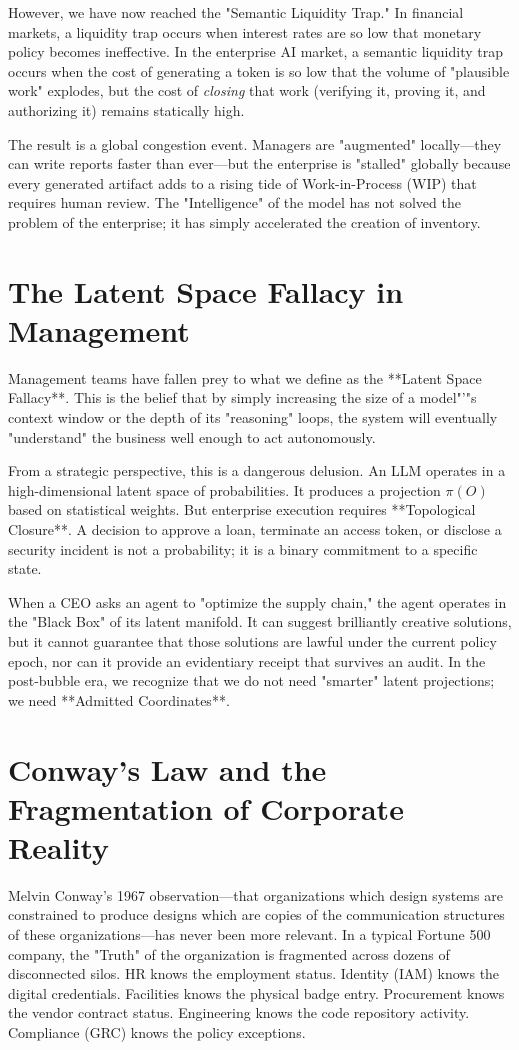 \documentclass[12pt,a4paper,oneside]{book}
\begin{document}
However, we have now reached the "Semantic Liquidity Trap." In financial markets, a liquidity trap occurs when interest rates are so low that monetary policy becomes ineffective. In the enterprise AI market, a semantic liquidity trap occurs when the cost of generating a token is so low that the volume of "plausible work" explodes, but the cost of \textit{closing} that work (verifying it, proving it, and authorizing it) remains statically high. 

The result is a global congestion event. Managers are "augmented" locally---they can write reports faster than ever---but the enterprise is "stalled" globally because every generated artifact adds to a rising tide of Work-in-Process (WIP) that requires human review. The "Intelligence" of the model has not solved the problem of the enterprise; it has simply accelerated the creation of inventory.

\section{The Latent Space Fallacy in Management}
Management teams have fallen prey to what we define as the **Latent Space Fallacy**. This is the belief that by simply increasing the size of a model"'"s context window or the depth of its "reasoning" loops, the system will eventually "understand" the business well enough to act autonomously. 

From a strategic perspective, this is a dangerous delusion. An LLM operates in a high-dimensional latent space of probabilities. It produces a projection $\pi(O)$ based on statistical weights. But enterprise execution requires **Topological Closure**. A decision to approve a loan, terminate an access token, or disclose a security incident is not a probability; it is a binary commitment to a specific state. 

When a CEO asks an agent to "optimize the supply chain," the agent operates in the "Black Box" of its latent manifold. It can suggest brilliantly creative solutions, but it cannot guarantee that those solutions are lawful under the current policy epoch, nor can it provide an evidentiary receipt that survives an audit. In the post-bubble era, we recognize that we do not need "smarter" latent projections; we need **Admitted Coordinates**.

\section{Conway’s Law and the Fragmentation of Corporate Reality}
Melvin Conway’s 1967 observation---that organizations which design systems are constrained to produce designs which are copies of the communication structures of these organizations---has never been more relevant. In a typical Fortune 500 company, the "Truth" of the organization is fragmented across dozens of disconnected silos. HR knows the employment status. Identity (IAM) knows the digital credentials. Facilities knows the physical badge entry. Procurement knows the vendor contract status. Engineering knows the code repository activity. Compliance (GRC) knows the policy exceptions.
\end{document}
